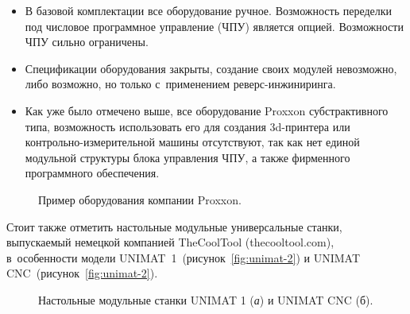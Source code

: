 \begin{itemize}
	\item В базовой комплектации все оборудование ручное. Возможность переделки под числовое программное управление (ЧПУ) является опцией. Возможности ЧПУ сильно ограничены.
	
	\item Спецификации оборудования закрыты, создание своих модулей невозможно, либо возможно, но только с~применением реверс-инжиниринга.
	
	\item Как уже было отмечено выше, все оборудование Proxxon субстрактивного типа, возможность использовать его для создания 3d-принтера или контрольно-измерительной машины отсутствуют, так как нет единой модульной структуры блока управления ЧПУ, а также фирменного программного обеспечения.	
\end{itemize}

\begin{figure}[ht]
	\caption{Пример оборудования компании Proxxon.}\label{fig:proxxon}
\end{figure}

Стоит также отметить настольные модульные универсальные станки, выпускаемый немецкой компанией TheCoolTool (thecooltool.com), в~особенности модели UNIMAT~1~(рисунок~\cref{fig:unimat-2}) и UNIMAT CNC~(рисунок~\cref{fig:unimat-2}).

\begin{figure}[ht]
	\caption{Настольные модульные станки UNIMAT 1 (\textit{а}) и UNIMAT CNC (б).}\label{fig:unimat}
\end{figure}

